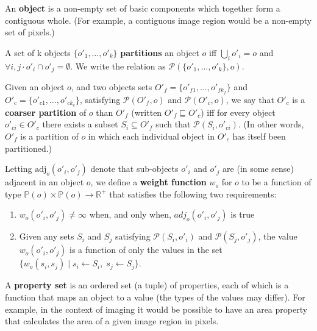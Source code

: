 \begin{definition}
An \textbf{object} is a non-empty set of basic components which together form a contiguous whole. (For example, a contiguous image region would be a non-empty set of pixels.)
\end{definition}

\begin{definition}
A set of k objects $\{o'_1,\ldots,o'_k\}$ \textbf{partitions} an object $o$ iff $\bigcup_i o'_i = o$ and $\forall i,j \cdot o'_i \cap o'_j = \emptyset$. We write the relation as $\mathcal{P}(\{o'_1,\ldots,o'_k\}, o)$.
\end{definition}

\begin{definition}
Given an object $o$, and two objects sets $O'_f = \{o'_{f1},\ldots,o'_{fk_f}\}$ and $O'_c = \{o'_{c1},\ldots,o'_{ck_c}\}$, satisfying $\mathcal{P}(O'_f,o)$ and $\mathcal{P}(O'_c,o)$, we say that $O'_c$ is a \textbf{coarser partition} of $o$ than $O'_f$ (written $O'_f \sqsubseteq O'_c$) iff for every object $o'_{ci} \in O'_c$ there exists a subset $S_i \subseteq O'_f$ such that $\mathcal{P}(S_i,o'_{ci})$. (In other words, $O'_f$ is a partition of $o$ in which each individual object in $O'_c$ has itself been partitioned.)
\end{definition}

\begin{definition}
Letting $\mbox{adj}_o(o'_i, o'_j)$ denote that sub-objects $o'_i$ and $o'_j$ are (in some sense) adjacent in an object $o$, we define a \textbf{weight function} $w_o$ for $o$ to be a function of type $\mathbb{P}(o) \times \mathbb{P}(o) \to \mathbb{R}^+$ that satisfies the following two requirements:
%
\begin{enumerate}

\item $w_o(o'_i, o'_j) \ne \infty$ when, and only when, $adj_o(o'_i, o'_j)$ is true

\item Given any sets $S_i$ and $S_j$ satisfying $\mathcal{P}(S_i,o'_i)$ and $\mathcal{P}(S_j,o'_j)$, the value $w_o(o'_i, o'_j)$ is a function of only the values in the set $\{w_o(s_i, s_j) \; | \; s_i \leftarrow S_i, \; s_j \leftarrow S_j\}$.

\end{enumerate}

\end{definition}

\begin{definition}
A \textbf{property set} is an ordered set (a tuple) of properties, each of which is a function that maps an object to a value (the types of the values may differ). For example, in the context of imaging it would be possible to have an area property that calculates the area of a given image region in pixels.
\end{definition}

